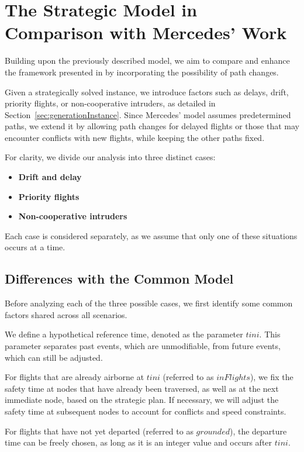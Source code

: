 \documentclass[../thesis.tex]{subfiles}
\begin{document}
\section{The Strategic Model in Comparison with Mercedes' Work}  
\label{sec:MercedesModification}  

Building upon the previously described model, we aim to compare and enhance the framework presented in \cite{pelegrin-2023} by incorporating the possibility of path changes.  

Given a strategically solved instance, we introduce factors such as delays, drift, priority flights, or non-cooperative intruders, as detailed in Section~\ref{sec:generationInstance}. Since Mercedes' model assumes predetermined paths, we extend it by allowing path changes for delayed flights or those that may encounter conflicts with new flights, while keeping the other paths fixed.  

For clarity, we divide our analysis into three distinct cases:  
\begin{itemize}
    \item \textbf{Drift and delay}  
    \item \textbf{Priority flights}  
    \item \textbf{Non-cooperative intruders}  
\end{itemize}

Each case is considered separately, as we assume that only one of these situations occurs at a time.  

\subsection{Differences with the Common Model}  

Before analyzing each of the three possible cases, we first identify some common factors shared across all scenarios.  

We define a hypothetical reference time, denoted as the parameter $tini$. This parameter separates past events, which are unmodifiable, from future events, which can still be adjusted.  

For flights that are already airborne at $tini$ (referred to as $inFlights$), we fix the safety time at nodes that have already been traversed, as well as at the next immediate node, based on the strategic plan. If necessary, we will adjust the safety time at subsequent nodes to account for conflicts and speed constraints.

For flights that have not yet departed (referred to as $grounded$), the departure time can be freely chosen, as long as it is an integer value and occurs after $tini$.
\end{document}
